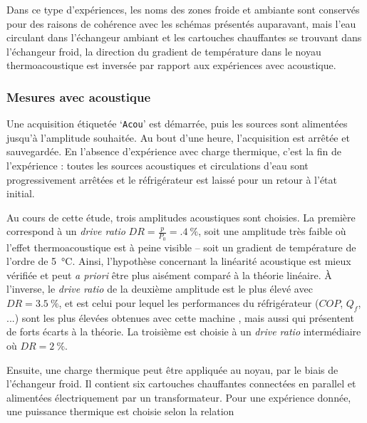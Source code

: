 Dans ce type d'expériences, les noms des zones \og froide \fg{} et \og ambiante \fg{} sont conservés pour des raisons de cohérence avec les schémas présentés auparavant, mais l'eau circulant dans l'échangeur ambiant et les cartouches chauffantes se trouvant dans l'échangeur froid, la direction du gradient de température dans le noyau thermoacoustique est inversée par rapport aux expériences avec acoustique. %


\subsubsection{Mesures avec acoustique}\label{chap:MesureAvecAcou} 
Une acquisition étiquetée `\texttt{Acou}' est démarrée, puis les sources sont alimentées jusqu'à l'amplitude souhaitée. Au bout d'une heure, l'acquisition est arrêtée et sauvegardée. En l'absence d'expérience avec charge thermique, c'est la fin de l'expérience : toutes les sources acoustiques et circulations d'eau sont progressivement arrêtées et le réfrigérateur est laissé pour un retour à l'état initial.

Au cours de cette étude, trois amplitudes acoustiques sont choisies. La première correspond à un \textit{drive ratio} $DR=\frac{p}{P_0}=\qty{.4}{\percent}$, soit une amplitude très faible où l'effet thermoacoustique est à peine visible -- soit un gradient de température de l'ordre de \qty{5}{\degreeCelsius}. Ainsi, l'hypothèse concernant la linéarité acoustique est mieux vérifiée et peut \textit{a priori} être plus aisément comparé à la théorie linéaire. À l'inverse, le \textit{drive ratio} de la deuxième amplitude est le plus élevé avec $DR=\qty{3.5}{\percent}$, et est celui pour lequel les performances du réfrigérateur ($COP$, $Q_f$, ...) sont les plus élevées obtenues avec cette machine \cite{ramadan_design_2021}, mais aussi qui présentent de forts écarts à la théorie. La troisième est choisie à un \textit{drive ratio} intermédiaire où $DR=\qty{2}{\percent}$. 

Ensuite, une charge thermique peut être appliquée au noyau, par le biais de l'échangeur froid. Il contient six cartouches chauffantes connectées en parallel et alimentées électriquement par un transformateur. Pour une expérience donnée, une puissance thermique est choisie selon la relation

